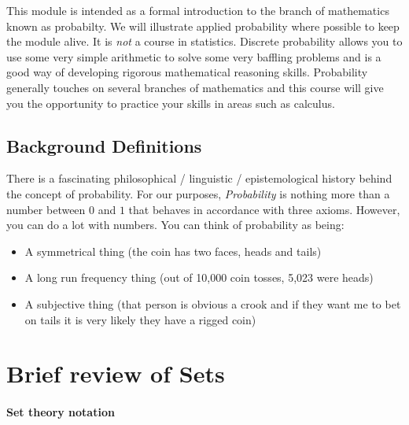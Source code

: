 \documentclass[12pt]{extbook}
\begin{document}
This module is intended as a formal introduction to the branch of mathematics known as probabilty.   We will illustrate applied probability where possible to keep the module alive.   It is \emph{not} a course in statistics.   Discrete probability allows you to use some very simple arithmetic to solve some very baffling problems and is a good way of developing rigorous mathematical reasoning skills.   Probability generally touches on several branches of mathematics and this course will give you the opportunity to practice your skills in areas such as calculus.

\section{Background Definitions}

There is a fascinating philosophical / linguistic / epistemological history behind the concept of probability.   For our purposes, \emph{Probability} is nothing more than a number between $0$ and $1$ that behaves in accordance with three axioms.   However, you can do a lot with numbers.   You can think of probability as being:

\begin{itemize}
\item A symmetrical thing (the coin has two faces, heads and tails)
\item A long run frequency thing (out of 10,000 coin tosses, 5,023 were heads)
\item A subjective thing (that person is obvious a crook and if they want me to bet on tails it is very likely they have a rigged coin)
\end{itemize}







\chapter{Brief review of Sets}

\subsubsection{Set theory notation}

 
\end{document}
